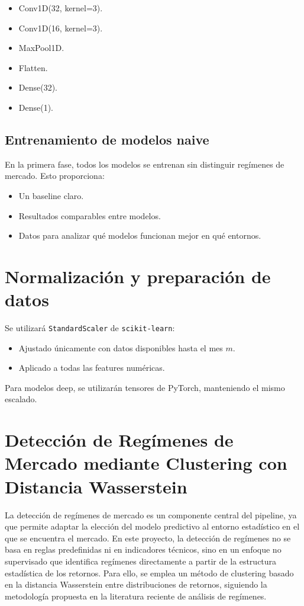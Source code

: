 \documentclass[12pt]{article}
\begin{document}
\begin{itemize}
    \item Conv1D(32, kernel=3).
    \item Conv1D(16, kernel=3).
    \item MaxPool1D.
    \item Flatten.
    \item Dense(32).
    \item Dense(1).
\end{itemize}

\subsection{Entrenamiento de modelos naive}

En la primera fase, todos los modelos se entrenan sin distinguir regímenes de mercado. Esto proporciona:

\begin{itemize}
    \item Un baseline claro.
    \item Resultados comparables entre modelos.
    \item Datos para analizar qué modelos funcionan mejor en qué entornos.
\end{itemize}

\section{Normalización y preparación de datos}

Se utilizará \texttt{StandardScaler} de \texttt{scikit-learn}:

\begin{itemize}
    \item Ajustado únicamente con datos disponibles hasta el mes $m$.
    \item Aplicado a todas las features numéricas.
\end{itemize}

Para modelos deep, se utilizarán tensores de PyTorch, manteniendo el mismo escalado.

\section{Detección de Regímenes de Mercado mediante Clustering con Distancia Wasserstein}

La detección de regímenes de mercado es un componente central del pipeline, ya que permite adaptar la elección del modelo predictivo al entorno estadístico en el que se encuentra el mercado. En este proyecto, la detección de regímenes no se basa en reglas predefinidas ni en indicadores técnicos, sino en un enfoque no supervisado que identifica regímenes directamente a partir de la estructura estadística de los retornos. Para ello, se emplea un método de clustering basado en la distancia Wasserstein entre distribuciones de retornos, siguiendo la metodología propuesta en la literatura reciente de análisis de regímenes.
\end{document}
